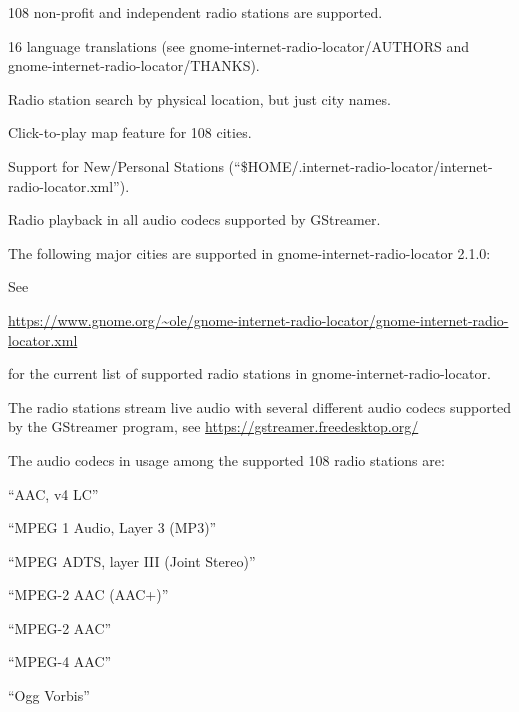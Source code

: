 \documentclass[20pt,landscape]{foils}
\begin{document}

\begin{list1}
\item 108 non-profit and independent radio stations are supported.
\item 16 language translations (see gnome-internet-radio-locator/AUTHORS and gnome-internet-radio-locator/THANKS).
\item Radio station search by physical location, but just city names.
\item Click-to-play map feature for 108 cities.
\item Support for New/Personal Stations (``\$HOME/.internet-radio-locator/internet-radio-locator.xml'').
\item Radio playback in all audio codecs supported by GStreamer.
\end{list1}


The following major cities are supported in gnome-internet-radio-locator 2.1.0:

\begin{list1}
\item
  \begin{list2}
    
  \end{list2}
\end{list1}

See
\begin{tiny}\url{https://www.gnome.org/~ole/gnome-internet-radio-locator/gnome-internet-radio-locator.xml}\end{tiny} for the current list of supported radio stations in gnome-internet-radio-locator.


The radio stations stream live audio with several different audio codecs supported by the GStreamer program, see \url{https://gstreamer.freedesktop.org/}

The audio codecs in usage among the supported 108 radio stations are:

\begin{list1}
  \item
    \begin{list2}
    \item ``AAC, v4 LC''
    \item ``MPEG 1 Audio, Layer 3 (MP3)''
    \item ``MPEG ADTS, layer III (Joint Stereo)''
    \item ``MPEG-2 AAC (AAC+)''
    \item ``MPEG-2 AAC''
    \item ``MPEG-4 AAC''
    \item ``Ogg Vorbis''
    \end{list2}
\end{list1}
\end{document}
